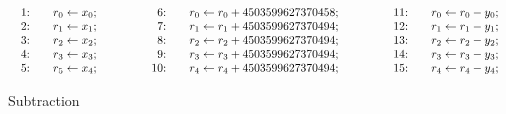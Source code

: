\begin{figure}[ht]
  \centering
  \[
  \begin{array}{lclcl}
    \begin{array}{rcl}
    \textmd{1:} && {r}_0 \leftarrow {x}_0; \\
    \textmd{2:} && {r}_1 \leftarrow {x}_1; \\
    \textmd{3:} && {r}_2 \leftarrow {x}_2; \\
    \textmd{4:} && {r}_3 \leftarrow {x}_3; \\
    \textmd{5:} && {r}_5 \leftarrow {x}_4; \\
    \end{array}
    &\hspace{.05\textwidth}&
    \begin{array}{rcl}
    \textmd{6:} && 
      {r}_0 \leftarrow {r}_0 + {4503599627370458}; \\
    \textmd{7:} &&
      {r}_1 \leftarrow {r}_1 + {4503599627370494}; \\
    \textmd{8:} &&
      {r}_2 \leftarrow {r}_2 + {4503599627370494}; \\
    \textmd{9:} &&
      {r}_3 \leftarrow {r}_3 + {4503599627370494}; \\
    \textmd{10:} && 
      {r}_4 \leftarrow {r}_4 + {4503599627370494};\\
    \end{array}
    &\hspace{.05\textwidth}&
    \begin{array}{rcl}
    \textmd{11:} && {r}_0 \leftarrow {r}_0 - {y}_0; \\
    \textmd{12:} && {r}_1 \leftarrow {r}_1 - {y}_1; \\
    \textmd{13:} && {r}_2 \leftarrow {r}_2 - {y}_2; \\
    \textmd{14:} && {r}_3 \leftarrow {r}_3 - {y}_3; \\
    \textmd{15:} && {r}_4 \leftarrow {r}_4 - {y}_4;
    \end{array}
  \end{array}
  \]
  \caption{Subtraction }
  \label{figure:dsl:subtraction}
\end{figure}

